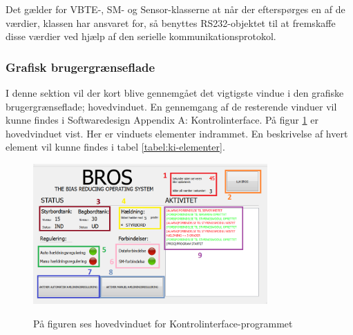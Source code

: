 Det gælder for VBTE-, SM- og Sensor-klasserne at når der efterspørges en af de værdier, klassen har ansvaret for, så benyttes RS232-objektet til at fremskaffe disse værdier ved hjælp af den serielle kommunikationsprotokol. 


\subsubsection{Grafisk brugergrænseflade}
I denne sektion vil der kort blive gennemgået det vigtigste vindue i den grafiske brugergrænseflade; hovedvinduet. En gennemgang af de resterende vinduer vil kunne findes i Softwaredesign Appendix A: Kontrolinterface.
På figur \ref{fig:hovedvindue} er hovedvinduet vist. Her er vinduets elementer indrammet. En beskrivelse af hvert element vil kunne findes i tabel \ref{tabel:ki-elementer}.

\begin{figure}[H]
\centering
\includegraphics[width=0.8\textwidth]{billeder/KI/hovedvindue}
\label{fig:hovedvindue}
\caption{På figuren ses hovedvinduet for Kontrolinterface-programmet}
\end{figure}


